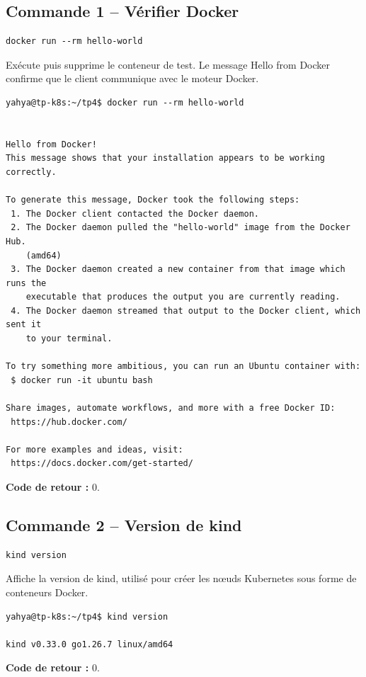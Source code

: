 \documentclass[11pt,a4paper]{article}
\begin{document}
\subsection{Commande 1 -- Vérifier Docker}
\begin{lstlisting}
docker run --rm hello-world
\end{lstlisting}
Exécute puis supprime le conteneur de test. Le message Hello from Docker confirme que le client communique avec le moteur Docker.
\begin{tcolorbox}[terminal,title={Ubuntu / WSL2 -- Commande 1 -- rendu reconstitué}]
\begin{Verbatim}[fontsize=\scriptsize,breaklines=true,breakanywhere=true,breaksymbolleft={},breaksymbolright={}]
yahya@tp-k8s:~/tp4$ docker run --rm hello-world


Hello from Docker!
This message shows that your installation appears to be working correctly.

To generate this message, Docker took the following steps:
 1. The Docker client contacted the Docker daemon.
 2. The Docker daemon pulled the "hello-world" image from the Docker Hub.
    (amd64)
 3. The Docker daemon created a new container from that image which runs the
    executable that produces the output you are currently reading.
 4. The Docker daemon streamed that output to the Docker client, which sent it
    to your terminal.

To try something more ambitious, you can run an Ubuntu container with:
 $ docker run -it ubuntu bash

Share images, automate workflows, and more with a free Docker ID:
 https://hub.docker.com/

For more examples and ideas, visit:
 https://docs.docker.com/get-started/
\end{Verbatim}
\end{tcolorbox}
\textbf{Code de retour :} 0.

\subsection{Commande 2 -- Version de kind}
\begin{lstlisting}
kind version
\end{lstlisting}
Affiche la version de kind, utilisé pour créer les nœuds Kubernetes sous forme de conteneurs Docker.
\begin{tcolorbox}[terminal,title={Ubuntu / WSL2 -- Commande 2 -- rendu reconstitué}]
\begin{Verbatim}[fontsize=\scriptsize,breaklines=true,breakanywhere=true,breaksymbolleft={},breaksymbolright={}]
yahya@tp-k8s:~/tp4$ kind version

kind v0.33.0 go1.26.7 linux/amd64
\end{Verbatim}
\end{tcolorbox}
\textbf{Code de retour :} 0.
\end{document}
